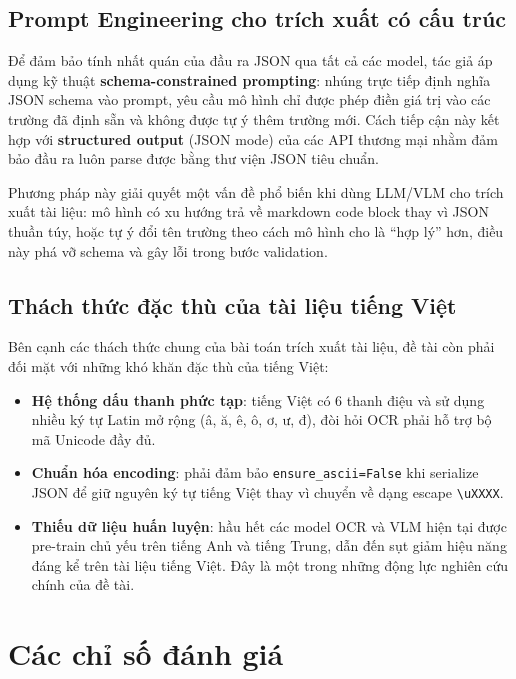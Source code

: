 ﻿\documentclass[12pt]{report}
\begin{document}
\subsection{Prompt Engineering cho trích xuất có cấu trúc}\label{sec:prompt_engineering}

Để đảm bảo tính nhất quán của đầu ra JSON qua tất cả các model, tác giả áp dụng kỹ thuật \textbf{schema-constrained prompting}: nhúng trực tiếp định nghĩa JSON schema vào prompt, yêu cầu mô hình chỉ được phép điền giá trị vào các trường đã định sẵn và không được tự ý thêm trường mới. Cách tiếp cận này kết hợp với \textbf{structured output} (JSON mode) của các API thương mại nhằm đảm bảo đầu ra luôn parse được bằng thư viện JSON tiêu chuẩn.

Phương pháp này giải quyết một vấn đề phổ biến khi dùng LLM/VLM cho trích xuất tài liệu: mô hình có xu hướng trả về markdown code block thay vì JSON thuần túy, hoặc tự ý đổi tên trường theo cách mô hình cho là ``hợp lý'' hơn, điều này phá vỡ schema và gây lỗi trong bước validation.

\subsection{Thách thức đặc thù của tài liệu tiếng Việt}\label{sec:vietnamese_challenges}

Bên cạnh các thách thức chung của bài toán trích xuất tài liệu, đề tài còn phải đối mặt với những khó khăn đặc thù của tiếng Việt:

\begin{itemize}
    \item \textbf{Hệ thống dấu thanh phức tạp}: tiếng Việt có 6 thanh điệu và sử dụng nhiều ký tự Latin mở rộng (â, ă, ê, ô, ơ, ư, đ), đòi hỏi OCR phải hỗ trợ bộ mã Unicode đầy đủ.
    \item \textbf{Chuẩn hóa encoding}: phải đảm bảo \texttt{ensure\_ascii=False} khi serialize JSON để giữ nguyên ký tự tiếng Việt thay vì chuyển về dạng escape \texttt{\textbackslash uXXXX}.
    \item \textbf{Thiếu dữ liệu huấn luyện}: hầu hết các model OCR và VLM hiện tại được pre-train chủ yếu trên tiếng Anh và tiếng Trung, dẫn đến sụt giảm hiệu năng đáng kể trên tài liệu tiếng Việt. Đây là một trong những động lực nghiên cứu chính của đề tài.
\end{itemize}

\section{Các chỉ số đánh giá}\label{sec:metrics}
\end{document}
